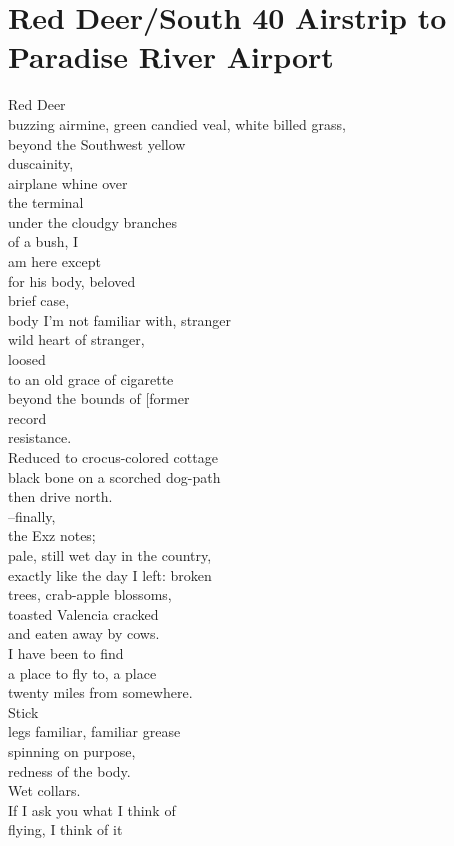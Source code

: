 \documentclass[smalldemyvopaper,11pt,twoside,onecolumn,openright,extrafontsizes]{memoir}
\begin{document}
\chapter{Red Deer/South 40 Airstrip to Paradise River Airport}
Red Deer
\\buzzing airmine, green candied veal, white billed grass,
\\beyond the Southwest yellow
\\duscainity,
\\airplane whine over
\\the terminal
\\under the cloudgy branches
\\of a bush, I
\\am here except
\\for his body, beloved
\\brief case,
\\body I'm not familiar with, stranger
\\wild heart of stranger,
\\loosed
\\to an old grace of cigarette
\\beyond the bounds of [former
\\record
\\ resistance.
\\Reduced to crocus-colored cottage
\\black bone on a scorched dog-path
\\then drive north.
\\--finally,
\\the Exz notes;
\\pale, still wet day in the country,
\\exactly like the day I left: broken
\\trees, crab-apple blossoms,
\\toasted Valencia cracked
\\and eaten away by cows.
\\I have been to find
\\a place to fly to, a place
\\twenty miles from somewhere.
\\Stick
\\legs familiar, familiar grease
\\spinning on purpose,
\\redness of the body.
\\Wet collars.
\\If I ask you what I think of
\\flying, I think of it
\end{document}
